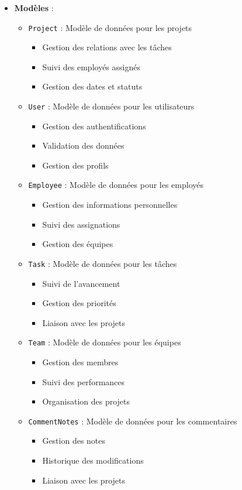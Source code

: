 \documentclass[12pt,a4paper]{article}
\begin{document}
\begin{itemize}
    \item \textbf{Modèles} :
    \begin{itemize}
        \item \texttt{Project} : Modèle de données pour les projets
        \begin{itemize}
            \item Gestion des relations avec les tâches
            \item Suivi des employés assignés
            \item Gestion des dates et statuts
        \end{itemize}
        \item \texttt{User} : Modèle de données pour les utilisateurs
        \begin{itemize}
            \item Gestion des authentifications
            \item Validation des données
            \item Gestion des profils
        \end{itemize}
        \item \texttt{Employee} : Modèle de données pour les employés
        \begin{itemize}
            \item Gestion des informations personnelles
            \item Suivi des assignations
            \item Gestion des équipes
        \end{itemize}
        \item \texttt{Task} : Modèle de données pour les tâches
        \begin{itemize}
            \item Suivi de l'avancement
            \item Gestion des priorités
            \item Liaison avec les projets
        \end{itemize}
        \item \texttt{Team} : Modèle de données pour les équipes
        \begin{itemize}
            \item Gestion des membres
            \item Suivi des performances
            \item Organisation des projets
        \end{itemize}
        \item \texttt{CommentNotes} : Modèle de données pour les commentaires
        \begin{itemize}
            \item Gestion des notes
            \item Historique des modifications
            \item Liaison avec les projets
        \end{itemize}
    \end{itemize}


\end{itemize}
\end{document}
